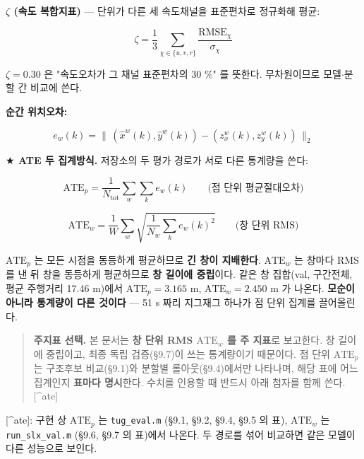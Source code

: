 \documentclass[10pt,a4paper]{article}
\begin{document}
\textbf{$\zeta$ (속도 복합지표)} --- 단위가 다른 세 속도채널을 표준편차로 정규화해 평균:

\begin{equation*}
\zeta = \frac{1}{3}\sum_{\chi \in \{u, v, r\}} \frac{\mathrm{RMSE}_\chi}{\sigma_\chi} \tag{38}
\end{equation*}

$\zeta = 0.30$ 은 "속도오차가 그 채널 표준편차의 30 \%" 를 뜻한다. 무차원이므로 모델$\cdot$분할 간 비교에 쓴다.

\textbf{순간 위치오차:}

\begin{equation*}
e_w(k) = \big\|\,(\hat{x}^w(k), \hat{y}^w(k)) - (z^w_x(k), z^w_y(k))\,\big\|_2 \tag{39}
\end{equation*}

\textbf{$\bigstar$ ATE 두 집계방식.} 저장소의 두 평가 경로가 서로 다른 통계량을 쓴다:

\begin{equation*}
\mathrm{ATE}_p = \frac{1}{N_{\text{tot}}}\sum_{w}\sum_{k} e_w(k)
\qquad \text{(점 단위 평균절대오차)} \tag{40}
\end{equation*}

\begin{equation*}
\mathrm{ATE}_w = \frac{1}{W}\sum_{w}
\sqrt{\frac{1}{N_w}\sum_{k} e_w(k)^2}
\qquad \text{(창 단위 RMS)} \tag{41}
\end{equation*}

$\mathrm{ATE}_p$ 는 모든 시점을 동등하게 평균하므로 \textbf{긴 창이 지배한다}. $\mathrm{ATE}_w$ 는 창마다 RMS 를 낸 뒤 창을 동등하게 평균하므로 \textbf{창 길이에 중립}이다. 같은 창 집합(val, 구간전체, 평균 주행거리 17.46 m)에서 $\mathrm{ATE}_p = 3.165$ m, $\mathrm{ATE}_w = 2.450$ m 가 나온다. \textbf{모순이 아니라 통계량이 다른 것이다} --- 51 s 짜리 지그재그 하나가 점 단위 집계를 끌어올린다.

\begin{quote}\small
\textbf{주지표 선택.} 본 문서는 \textbf{창 단위 RMS $\mathrm{ATE}_w$ 를 주 지표}로 보고한다. 창 길이에 중립이고, 최종 독립 검증(\S{}9.7)이 쓰는 통계량이기 때문이다. 점 단위 $\mathrm{ATE}_p$ 는 구조후보 비교(\S{}9.1)와 분할별 롤아웃(\S{}9.4)에서만 나타나며, 해당 표에 어느 집계인지 \textbf{표마다 명시}한다. 수치를 인용할 때 반드시 아래 첨자를 함께 쓴다.[\textasciicircum{}ate]
\end{quote}

[\textasciicircum{}ate]: 구현 상 $\mathrm{ATE}_p$ 는 \texttt{tug\_eval.m} (\S{}9.1, \S{}9.2, \S{}9.4, \S{}9.5 의 표), $\mathrm{ATE}_w$ 는 \texttt{run\_slx\_val.m} (\S{}9.6, \S{}9.7 의 표)에서 나온다. 두 경로를 섞어 비교하면 같은 모델이 다른 성능으로 보인다.
\end{document}
